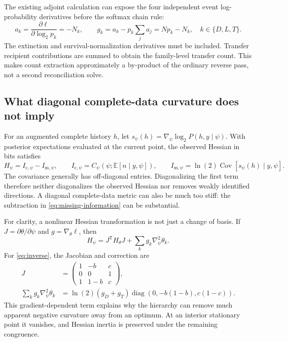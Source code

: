 \documentclass[11pt]{article}
\newcommand{\E}{\mathbb{E}}
\newcommand{\Cov}{\operatorname{Cov}}
\newcommand{\diag}{\operatorname{diag}}
\newcommand{\tr}{\mathsf T}
\begin{document}
The existing adjoint calculation can expose the four independent event
log-probability derivatives before the softmax chain rule:
\begin{equation}
 a_k=\frac{\partial\ell}{\partial\log_2 p_k}=-N_k,
 \qquad
 g_k=a_k-p_k\sum_j a_j=Np_k-N_k,
 \quad k\in\{D,L,T\}.
 \label{eq:count-check}
\end{equation}
The extinction and survival-normalization derivatives must be included. Transfer
recipient contributions are summed to obtain the family-level transfer count.
This makes count extraction approximately a by-product of the ordinary reverse
pass, not a second reconciliation solve.

\subsection{What diagonal complete-data curvature does not imply}

For an augmented complete history $h$, let
$s_\psi(h)=\nabla_\psi\log_2 P(h,y\mid\psi)$. With posterior expectations
evaluated at the current point, the observed Hessian in bits satisfies
\begin{equation}
 H_\psi=I_{\mathrm c,\psi}-I_{\mathrm m,\psi},\qquad
 I_{\mathrm c,\psi}=C_\psi(\psi;\E[n\mid y,\psi]),\qquad
 I_{\mathrm m,\psi}=\ln(2)\Cov[s_\psi(h)\mid y,\psi].
 \label{eq:missing-information}
\end{equation}
The covariance generally has off-diagonal entries. Diagonalizing the first term
therefore neither diagonalizes the observed Hessian nor removes weakly
identified directions. A diagonal complete-data metric can also be much too
stiff: the subtraction in \eqref{eq:missing-information} can be substantial.

For clarity, a nonlinear Hessian transformation is not just a change of basis.
If $J=\partial\theta/\partial\psi$ and $g=\nabla_\theta\ell$, then
\begin{equation}
 H_\psi=J^\tr H_\theta J
       +\sum_k g_k\nabla_\psi^2\theta_k.
 \label{eq:hessian-transform}
\end{equation}
For \eqref{eq:inverse}, the Jacobian and correction are
\begin{align}
 J&=\begin{pmatrix}1&-b&c\\0&0&1\\1&1-b&c\end{pmatrix},\\
 \sum_k g_k\nabla_\psi^2\theta_k
 &=\ln(2)(g_D+g_T)\diag\!\left(0,-b(1-b),c(1-c)\right).
 \label{eq:explicit-correction}
\end{align}
This gradient-dependent term explains why the hierarchy can remove much apparent
negative curvature away from an optimum. At an interior stationary point it
vanishes, and Hessian inertia is preserved under the remaining congruence.
\end{document}
